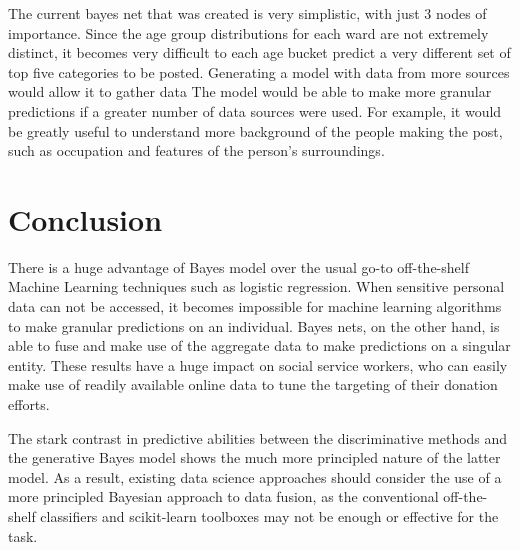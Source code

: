 \documentclass[12pt]{article}
\begin{document}
The current bayes net that was created is very simplistic, with just 3 nodes of importance. Since the age group distributions for each ward are not extremely distinct, it becomes very difficult to each age bucket predict a very different set of top five categories to be posted. Generating a model with data from more sources would allow it to gather data  The model would be able to make more granular predictions if a greater number of data sources were used. For example, it would be greatly useful to understand more background of the people making the post, such as occupation and features of the person's surroundings. 

\section{Conclusion}
There is a huge advantage of Bayes model over the usual go-to off-the-shelf Machine Learning techniques such as logistic regression. When sensitive personal data can not be accessed, it becomes impossible for machine learning algorithms to make granular predictions on an individual. Bayes nets, on the other hand, is able to fuse and make use of the aggregate data to make predictions on a singular entity. These results have a huge impact on social service workers, who can easily make use of readily available online data to tune the targeting of their donation efforts. 

The stark contrast in predictive abilities between the discriminative methods and the generative Bayes model shows the much more principled nature of the latter model. As a result, existing data science approaches should consider the use of a more principled Bayesian approach to data fusion, as the conventional off-the-shelf classifiers and scikit-learn toolboxes may not be enough or effective for the task. 



\end{document}
